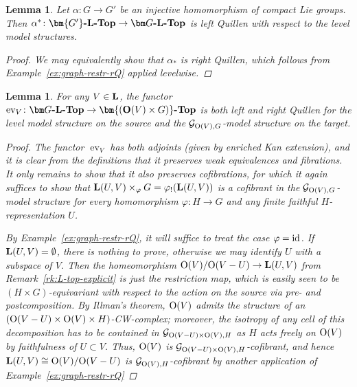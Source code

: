 \documentclass[reqno]{memo-l}
\theoremstyle{mythm}
\newtheorem{lemma}[thm]{Lemma}
\theoremstyle{definition}
\numberwithin{equation}{section}
\DeclareMathOperator{\ev}{ev}
\renewcommand{\phi}{\varphi}
\newcommand{\cat}[1]{\textbf{\textup{#1}}}
\renewcommand{\O}{{\textup{O}}}
\newcommand{\id}{\textup{id}}
\begin{document}
\begin{lemma}\label{lemma:orth-spc-lvl-inj-restr}
    Let $\alpha\colon G\to G'$ be an \emph{injective} homomorphism of compact Lie groups. Then $\alpha^*\colon\cat{$\bm{G'}$-$\cat{L}$-Top}\to\cat{$\bm G$-$\cat{L}$-Top}$ is left Quillen with respect to the level model structures.
    \begin{proof}
        We may equivalently show that $\alpha_*$ is right Quillen, which follows from Example~\ref{ex:graph-restr-rQ} applied levelwise.
    \end{proof}
\end{lemma}

\begin{lemma}\label{lemma:orth-spc-ev-lrQ}
    For any $V\in\cat{L}$, the functor $\ev_V\colon\cat{$\bm G$-\cat{L}-Top}\to\cat{$\bm{(\O(V)\times G)}$-Top}$ is both left and right Quillen for the level model structure on the source and the $\mathcal G_{\O(V),G}$-model structure on the target.
    \begin{proof}
        The functor $\ev_V$ has both adjoints (given by enriched Kan extension), and it is clear from the definitions that it preserves weak equivalences and fibrations. It only remains to show that it also preserves cofibrations, for which it again suffices to show that $\cat{L}(U,V)\times_\phi G=\phi_!(\cat{L}(U,V))$ is a cofibrant in the $\mathcal G_{\O(V),G}$-model structure for every homomorphism $\phi\colon H\to G$ and any finite faithful $H$-representation $U$. 
        
        By Example~\ref{ex:graph-restr-rQ}, it will suffice to treat the case $\phi=\id$. If $\cat{L}(U,V)=\emptyset$, there is nothing to prove, otherwise we may identify $U$ with a subspace of $V$. Then the homeomorphism $\O(V)/\O(V-U)\to\cat{L}(U,V)$ from Remark~\ref{rk:L-top-explicit} is just the restriction map, which is easily seen to be $(H\times G)$-equivariant with respect to the action on the source via pre- and postcomposition. By Illman's theorem, $\O(V)$ admits the structure of an $(\O(V-U)\times \O(V)\times H)$-CW-complex; moreover, the isotropy of any cell of this decomposition has to be contained in $\mathcal G_{\O(V-U)\times \O(V),H}$ as $H$ acts freely on $\O(V)$ by faithfulness of $U\subset V$. Thus, $\O(V)$ is $\mathcal G_{\O(V-U)\times \O(V),H}$-cofibrant, and hence $\cat{L}(U,V)\cong\O(V)/\O(V-U)$ is $\mathcal G_{\O(V),H}$-cofibrant by another application of Example~\ref{ex:graph-restr-rQ}
    \end{proof}
\end{lemma}
\end{document}
